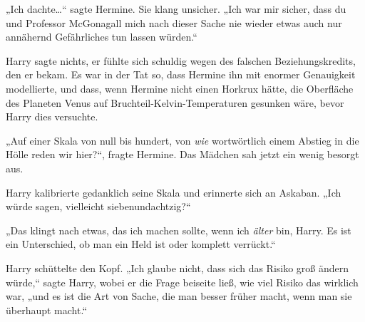 „Ich dachte…“ sagte Hermine. Sie klang unsicher. „Ich war mir sicher, dass du und Professor McGonagall mich nach dieser Sache nie wieder etwas auch nur annähernd Gefährliches tun lassen würden.“

Harry sagte nichts, er fühlte sich schuldig wegen des falschen Beziehungskredits, den er bekam. Es war in der Tat so, dass Hermine ihn mit enormer Genauigkeit modellierte, und dass, wenn Hermine nicht einen Horkrux hätte, die Oberfläche des Planeten Venus auf Bruchteil-Kelvin-Temperaturen gesunken wäre, bevor Harry dies versuchte.

„Auf einer Skala von null bis hundert, von \emph{wie} wortwörtlich einem Abstieg in die Hölle reden wir hier?“, fragte Hermine. Das Mädchen sah jetzt ein wenig besorgt aus.

Harry kalibrierte gedanklich seine Skala und erinnerte sich an Askaban.
„Ich würde sagen, vielleicht siebenundachtzig?“

„Das klingt nach etwas, das ich machen sollte, wenn ich \emph{älter} bin, Harry. Es ist ein Unterschied, ob man ein Held ist oder komplett verrückt.“

Harry schüttelte den Kopf. „Ich glaube nicht, dass sich das Risiko groß ändern würde,“ sagte Harry, wobei er die Frage beiseite ließ, wie viel Risiko das wirklich war, „und es ist die Art von Sache, die man besser früher macht, wenn man sie überhaupt macht.“

